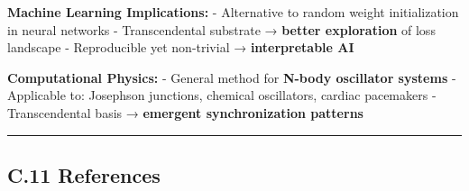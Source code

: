 \documentclass[
]{article}
\begin{document}
\textbf{Machine Learning Implications:} - Alternative to random weight
initialization in neural networks - Transcendental substrate →
\textbf{better exploration} of loss landscape - Reproducible yet
non-trivial → \textbf{interpretable AI}

\textbf{Computational Physics:} - General method for \textbf{N-body
oscillator systems} - Applicable to: Josephson junctions, chemical
oscillators, cardiac pacemakers - Transcendental basis →
\textbf{emergent synchronization patterns}

\begin{center}\rule{0.5\linewidth}{0.5pt}\end{center}

\subsection{C.11 References}\label{c.11-references}
\end{document}
